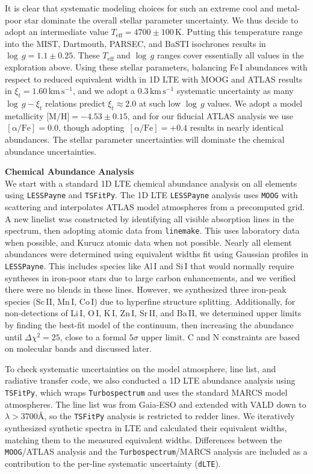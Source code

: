 \documentclass{natureprintstyle}
\newcommand{\code}[1]{\texttt{#1}\xspace}
\newcommand{\unit}[1]{\ensuremath{\mathrm{\,#1}}\xspace}
\newcommand{\teff}{\ensuremath{T_\mathrm{eff}}\xspace}
\newcommand{\Teff}{\teff}
\newcommand{\logg}{\ensuremath{\log\,g}\xspace}
\newcommand{\alphafe}{\unit{[\alpha/Fe]}}
\newcommand{\kms}{\unit{km\,s^{-1}}}
\begin{document}
It is clear that systematic modeling choices for such an extreme cool and metal-poor star dominate the overall stellar parameter uncertainty.
We thus decide to adopt an intermediate value $\Teff=4700 \pm 100$\,K. Putting this temperature range into the MIST, Dartmouth, PARSEC, and BaSTI isochrones results in $\logg = 1.1 \pm 0.25$.
These $\Teff$ and $\logg$ ranges cover essentially all values in the exploration above.
Using these stellar parameters, balancing Fe\,I abundances with respect to reduced equivalent width in 1D LTE with MOOG and ATLAS results in $\xi_t = 1.60\kms$, and we adopt a 0.3\kms systematic uncertainty as many $\logg-\xi_t$ relations predict $\xi_t \approx 2.0$ at such low \logg values\cite{Ji2023}.
We adopt a model metallicity $\mbox{[M/H]} = -4.53 \pm 0.15$, and for our fiducial ATLAS analysis we use $\alphafe = 0.0$, though adopting $\alphafe = +0.4$ results in nearly identical abundances.
The stellar parameter uncertainties will dominate the chemical abundance uncertainties.

\vspace{1mm}
\noindent
{\bf Chemical Abundance Analysis}
\\
\noindent
We start with a standard 1D LTE chemical abundance analysis on all elements using \code{LESSPayne}{\cite{Ji2025ascl}} and \code{TSFitPy}{\cite{Gerber2023}}.
The 1D LTE \code{LESSPayne} analysis uses \code{MOOG} with scattering and interpolates ATLAS model atmospheres from a precomputed grid.
A new linelist was constructed by identifying all visible absorption lines in the spectrum, then adopting atomic data from {\code{linemake}}\cite{Placco2021}.
This uses laboratory data when possible, and Kurucz atomic data when not possible.
Nearly all element abundances were determined using equivalent widths fit using Gaussian profiles in \code{LESSPayne}.
This includes species like Al\,I and Si\,I that would normally require syntheses in iron-poor stars due to large carbon enhancements, and we verified there were no blends in these lines.
However, we synthesized three iron-peak species (Sc\,II, Mn\,I, Co\,I) due to hyperfine structure splitting.
Additionally, for non-detections of Li\,I, O\,I, K\,I, Zn\,I, Sr\,II, and Ba\,II, we determined upper limits by finding the best-fit model of the continuum, then increasing the abundance until $\Delta\chi^2=25$, close to a formal $5\sigma$ upper limit\cite{Ji2020b}. C and N constraints are based on molecular bands and discussed later.

To check systematic uncertainties on the model atmosphere, line list, and radiative transfer code, we also conducted a 1D LTE abundance analysis using \code{TSFitPy}{\cite{Gerber2023}}, which wraps \code{Turbospectrum}{\cite{Plez2012}} and uses the standard MARCS model atmospheres\cite{Gustafsson2008}.
The line list was from Gaia-ESO\cite{Heiter2021} and extended with VALD\cite{VALD} down to $\lambda > 3700${\AA}, so the \code{TSFitPy} analysis is restricted to redder lines.
We iteratively synthesized synthetic spectra in LTE and calculated their equivalent widths, matching them to the measured equivalent widths.
Differences between the \code{MOOG}/ATLAS analysis and the \code{Turbospectrum}/MARCS analysis are included as a contribution to the per-line systematic uncertainty (\code{dLTE}).
\end{document}
